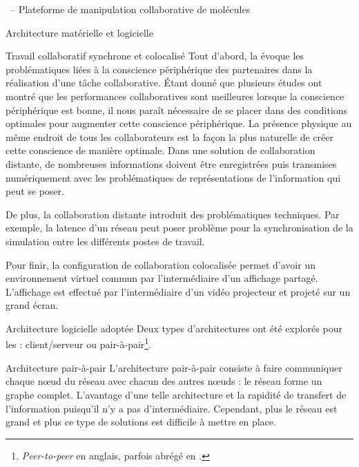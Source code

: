 \documentclass[myfrancais,ngerman,english,frenchb]{mythesis}
\begin{document}
\begin{mychapter}{\myShaddock\ -- Plateforme de manipulation collaborative de molécules}
\begin{mysection}{Architecture matérielle et logicielle}
\begin{mysubsection}{Travail collaboratif synchrone et colocalisé}
				Tout d'abord, la  évoque les problématiques liées à la conscience périphérique des partenaires dans la réalisation d'une tâche collaborative.
				Étant donné que plusieurs études ont montré que les performances collaboratives sont meilleures lorsque la conscience périphérique est bonne, il nous paraît nécessaire de se placer dans des conditions optimales pour augmenter cette conscience périphérique.
				La présence physique au même endroit de tous les collaborateurs est la façon la plus naturelle de créer cette conscience de manière optimale.
				Dans une solution de collaboration distante, de nombreuses informations doivent être enregistrées puis transmises numériquement avec les problématiques de représentations de l'information qui peut se poser.

				De plus, la collaboration distante introduit des problématiques techniques.
				Par exemple, la latence d'un réseau peut poser problème pour la synchronisation de la simulation entre les différents postes de travail.

				Pour finir, la configuration de collaboration colocalisée permet d'avoir un environnement virtuel commun par l'intermédiaire d'un affichage partagé.
				L'affichage est effectué par l'intermédiaire d'un vidéo projecteur et projeté sur un grand écran.
			\end{mysubsection}
			\begin{mysubsection}{Architecture logicielle adoptée}
				Deux types d'architectures ont été explorés pour les  : client/serveur ou pair-à-pair\footnote{\textit{Peer-to-peer} en anglais, parfois abrégé en \myPtwoP.}.
				\begin{mysubsubsection}{Architecture pair-à-pair}
					L'architecture pair-à-pair consiste à faire communiquer chaque nœud du réseau avec chacun des autres nœuds : le réseau forme un graphe complet.
					L'avantage d'une telle architecture et la rapidité de transfert de l'information puisqu'il n'y a pas d'intermédiaire.
					Cependant, plus le réseau est grand et plus ce type de solutions est difficile à mettre en place.


\end{mysubsubsection}
\end{mysubsection}
\end{mysection}
\end{mychapter}
\end{document}

